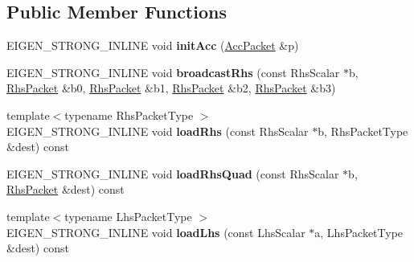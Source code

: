 \subsection*{Public Member Functions}
\begin{DoxyCompactItemize}
\item 
\mbox{\label{class_eigen_1_1internal_1_1gebp__traits_aa578620545719a8a4a1390c28852ae7b}} 
E\+I\+G\+E\+N\+\_\+\+S\+T\+R\+O\+N\+G\+\_\+\+I\+N\+L\+I\+NE void {\bfseries init\+Acc} (\mbox{\hyperlink{struct_eigen_1_1internal_1_1true__type}{Acc\+Packet}} \&p)
\item 
\mbox{\label{class_eigen_1_1internal_1_1gebp__traits_aa6e3a3234f62ac8d69785a361efb86f9}} 
E\+I\+G\+E\+N\+\_\+\+S\+T\+R\+O\+N\+G\+\_\+\+I\+N\+L\+I\+NE void {\bfseries broadcast\+Rhs} (const Rhs\+Scalar $\ast$b, \mbox{\hyperlink{struct_eigen_1_1internal_1_1true__type}{Rhs\+Packet}} \&b0, \mbox{\hyperlink{struct_eigen_1_1internal_1_1true__type}{Rhs\+Packet}} \&b1, \mbox{\hyperlink{struct_eigen_1_1internal_1_1true__type}{Rhs\+Packet}} \&b2, \mbox{\hyperlink{struct_eigen_1_1internal_1_1true__type}{Rhs\+Packet}} \&b3)
\item 
\mbox{\label{class_eigen_1_1internal_1_1gebp__traits_aa9ae85d85eae99a248dae6b2350999db}} 
{\footnotesize template$<$typename Rhs\+Packet\+Type $>$ }\\E\+I\+G\+E\+N\+\_\+\+S\+T\+R\+O\+N\+G\+\_\+\+I\+N\+L\+I\+NE void {\bfseries load\+Rhs} (const Rhs\+Scalar $\ast$b, Rhs\+Packet\+Type \&dest) const
\item 
\mbox{\label{class_eigen_1_1internal_1_1gebp__traits_a24faddc403d5ca4609bc0c3ccef20549}} 
E\+I\+G\+E\+N\+\_\+\+S\+T\+R\+O\+N\+G\+\_\+\+I\+N\+L\+I\+NE void {\bfseries load\+Rhs\+Quad} (const Rhs\+Scalar $\ast$b, \mbox{\hyperlink{struct_eigen_1_1internal_1_1true__type}{Rhs\+Packet}} \&dest) const
\item 
\mbox{\label{class_eigen_1_1internal_1_1gebp__traits_a4eb22d4856136599f64daf69b42b30d7}} 
{\footnotesize template$<$typename Lhs\+Packet\+Type $>$ }\\E\+I\+G\+E\+N\+\_\+\+S\+T\+R\+O\+N\+G\+\_\+\+I\+N\+L\+I\+NE void {\bfseries load\+Lhs} (const Lhs\+Scalar $\ast$a, Lhs\+Packet\+Type \&dest) const

\end{DoxyCompactItemize}
